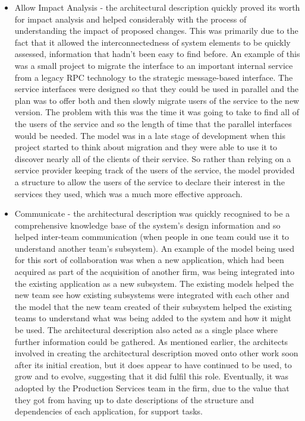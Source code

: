 \begin{itemize}
\item Allow Impact Analysis - the architectural description quickly proved its worth for impact analysis and helped considerably with the process of understanding the impact of proposed changes.  This was primarily due to the fact that it allowed the interconnectedness of system elements to be quickly assessed, information that hadn't been easy to find before.  An example of this was a small project to migrate the interface to an important internal service from a legacy RPC technology to the strategic message-based interface.  The service interfaces were designed so that they could be used in parallel and the plan was to offer both and then slowly migrate users of the service to the new version.  The problem with this was the time it was going to take to find all of the users of the service and so the length of time that the parallel interfaces would be needed.  The model was in a late stage of development when this project started to think about migration and they were able to use it to discover nearly all of the clients of their service.  So rather than relying on a service provider keeping track of the users of the service, the model provided a structure to allow the users of the service to declare their interest in the services they used, which was a much more effective approach.

\item Communicate - the architectural description was quickly recognised to be a comprehensive knowledge base of the system's design information and so helped inter-team communication (when people in one team could use it to understand another team's subsystem).  An example of the model being used for this sort of collaboration was when a new application, which had been acquired as part of the acquisition of another firm, was being integrated into the existing application as a new subsystem.  The existing models helped the new team see how existing subsystems were integrated with each other and the model that the new team created of their subsystem helped the existing teams to understand what was being added to the system and how it might be used.  The architectural description also acted as a single place where further information could be gathered.  As mentioned earlier, the architects involved in creating the architectural description moved onto other work soon after its initial creation, but it does appear to have continued to be used, to grow and to evolve, suggesting that it did fulfil this role.  Eventually, it was adopted by the Production Services team in the firm, due to the value that they got from having up to date descriptions of the structure and dependencies of each application, for support tasks.

\end{itemize}

